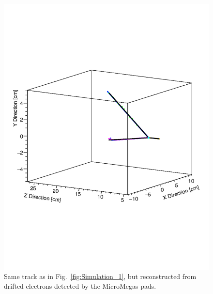 \documentclass[final,number,sort&compress,5p,times,twocolumn]{elsarticle}
\begin{document}
\begin{figure}[hbt!]
    \centering
     \includegraphics[width=1.0\columnwidth]{Figs/Simulation_2}
     \caption{Same track as in Fig.~\ref{fig:Simulation_1}, but reconstructed from drifted electrons
detected by the MicroMegas pads.}
     \label{fig:Simulation_2}
   \end{figure}
\end{document}
